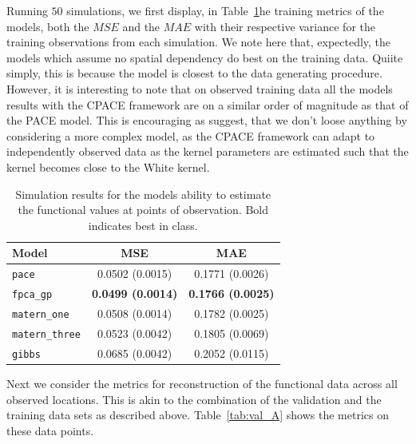 Running $50$ simulations, we first display, in Table~\ref{tab:train_A}he training metrics of the models, both the $MSE$ and the $MAE$ with their respective variance for the training observations from each simulation. 
We note here that, expectedly, the models which assume no spatial dependency do best on the training data.
Quiite simply, this is because the model is closest to the data generating procedure.
However, it is interesting to note that on observed training data all the models results with the CPACE framework are on a similar order of magnitude as that of the PACE model.
This is encouraging as suggest, that we don't loose anything by considering a more complex model, as the CPACE framework can adapt to independently observed data as the kernel parameters are estimated such that the kernel becomes close to the White kernel.

\begin{table}
	\caption[Simulation results for Scenario A on training data]{Simulation results for the models ability to estimate the functional values at points of observation. Bold indicates best in class.}
	\centering
	\label{tab:train_A}
	\begin{tabular}{lcc}
		\toprule
		\textbf{Model} & \textbf{MSE} & \textbf{MAE} \\
		\midrule
		\verb*|pace| & 0.0502 (0.0015) & 0.1771 (0.0026) \\
		\verb*|fpca_gp| & \textbf{0.0499 (0.0014)} & \textbf{0.1766 (0.0025)} \\
		\verb*|matern_one| & 0.0508 (0.0014) & 0.1782 (0.0025) \\
		\verb*|matern_three| & 0.0523 (0.0042) & 0.1805 (0.0069) \\
		\verb*|gibbs| & 0.0685 (0.0042) & 0.2052 (0.0115)\\
		\bottomrule
	\end{tabular}
\end{table}

Next we consider the metrics for reconstruction of the functional data across all observed locations.
This is akin to the combination of the validation and the training data sets as described above.
Table~\ref{tab:val_A} shows the metrics on these data points.

